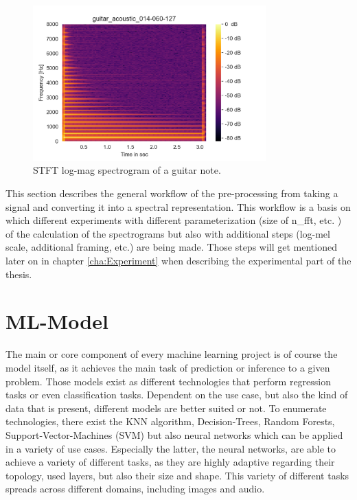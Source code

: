  \begin{figure}[htb!]
	\caption{STFT log-mag spectrogram of a guitar note.}
	\label{fig:spectrogram}
	\centering
	\includegraphics[width=0.8\textwidth]{images/approach/guitar_acoustic_014-060-127.png}
\end{figure}

This section describes the general workflow of the pre-processing from taking a signal and converting it into a spectral representation. This workflow is a basis on which different experiments with different parameterization (size of n\_fft, etc. ) of the calculation of the spectrograms but also with additional steps (log-mel scale, additional framing, etc.) are being made. Those steps will get mentioned later on in chapter \ref{cha:Experiment} when describing the experimental part of the thesis.

\section{ML-Model}
\label{sec:app_model}
The main or core component of every machine learning project is of course the model itself, as it achieves the main task of prediction or inference to a given problem. Those models exist as different technologies that perform regression tasks or even classification tasks. Dependent on the use case, but also the kind of data that is present, different models are better suited or not. To enumerate technologies, there exist the KNN algorithm, Decision-Trees, Random Forests, Support-Vector-Machines (SVM) but also neural networks which can be applied in a variety of use cases. Especially the latter, the neural networks, are able to achieve a variety of different tasks, as they are highly adaptive regarding their topology, used layers, but also their size and shape. This variety of different tasks spreads across different domains, including images and audio. 

